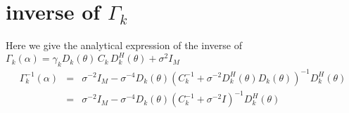 \documentclass[a4paper, 12pt]{report}
\begin{document}
\chapter{inverse of $\Gamma_{k}$}
Here we give the analytical expression of the inverse of $\Gamma_{k}(\alpha)=\gamma_{k}D_{k}(\theta)\, C_{k}\,D_{k}^{H}(\theta)+\sigma^{2}I_{M}$
\begin{eqnarray*}
\Gamma_{k}^{-1}(\alpha)&=&
\sigma^{-2}I_{M}-\sigma^{-4}D_{k}(\theta)(C_{k}^{-1}+\sigma^{-2}D_{k}^{H}(\theta)D_{k}(\theta))^{-1}D_{k}^{H}(\theta)
\\
&=&
\sigma^{-2}I_{M}-\sigma^{-4}D_{k}(\theta)(C_{k}^{-1}+\sigma^{-2}I)^{-1}D_{k}^{H}(\theta)
\end{eqnarray*}
\end{document}
